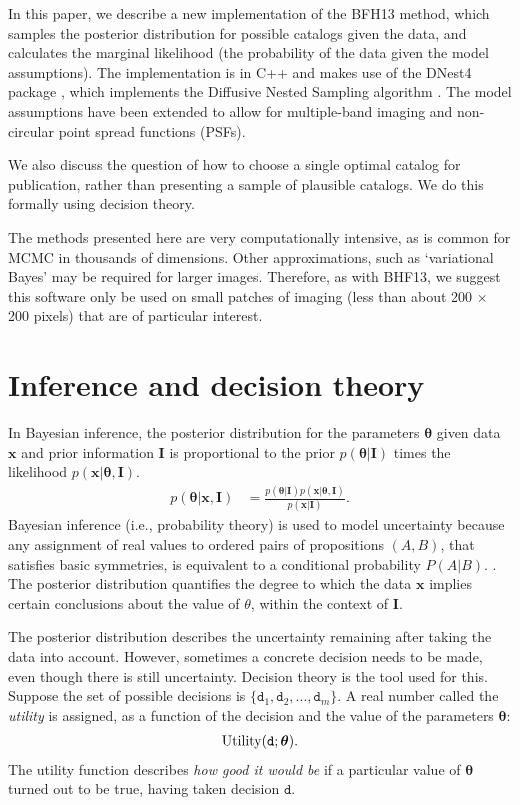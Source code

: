 \documentclass[a4paper,fleqn,usenatbib]{mnras}
\newcommand{\params}{\boldsymbol{\theta}}
\newcommand{\data}{\boldsymbol{x}}
\newcommand{\info}{\boldsymbol{I}}
\newcommand{\decision}{\texttt{d}}
\begin{document}
In this paper, we describe a new implementation of the
BFH13
method, which samples the posterior distribution for possible catalogs
given the data, and calculates the marginal likelihood (the probability of
the data given the model assumptions).
The implementation is in C++ and makes use of the DNest4 package
\citep{dnest4}, which implements the Diffusive Nested Sampling algorithm
\citep{dns}. The model assumptions have been extended to allow for multiple-band
imaging and non-circular point spread functions (PSFs).

We also discuss the question of how to choose a single optimal catalog for
publication, rather than presenting a sample of plausible catalogs.
We do this formally using decision theory.

The methods presented here are very computationally intensive, as is common
for MCMC in thousands of dimensions. Other approximations, such as
`variational Bayes' \citep[as used by e.g.,][]{regier2016learning} may be
required for larger images. Therefore, as with BHF13,
we suggest this software only be used
on small patches of imaging (less than about 200 $\times$ 200 pixels) that
are of particular interest.

\section{Inference and decision theory}
In Bayesian inference, the posterior distribution for the parameters
$\params$ given data $\data$ and prior information $\info$ is proportional
to the prior $p(\params | \info)$
times the likelihood $p(\data | \params, \info)$.
\begin{align}
p(\params | \data, \info) &=
    \frac{p(\params | \info)p(\data | \params, \info)}{p(\data | \info)}.
\end{align}
Bayesian inference (i.e., probability theory) is used to model uncertainty
because any assignment of real values to
ordered pairs of propositions $(A, B)$, that satisfies basic
symmetries, is equivalent to a conditional probability $P(A | B)$.
\citep{knuth2012foundations}. The posterior distribution quantifies the degree
to which the data $\data$ implies certain conclusions about the value of
$\theta$, within the context of $\info$.

The posterior distribution describes the uncertainty remaining after
taking the data into account. However, sometimes a concrete decision needs to
be made, even though there is still uncertainty. Decision theory is the
tool used for this. Suppose the set of possible decisions is
$\{\decision_1, \decision_2, ..., \decision_m\}$. A real number called the
{\em utility} is assigned, as a function of the decision and the
value of the parameters $\params$:
\begin{align}
\textnormal{Utility}(\decision; \params).
\end{align}
The utility function describes {\em how good it would be} if a particular
value of $\params$ turned out to be true, having taken decision $\decision$.
\end{document}
